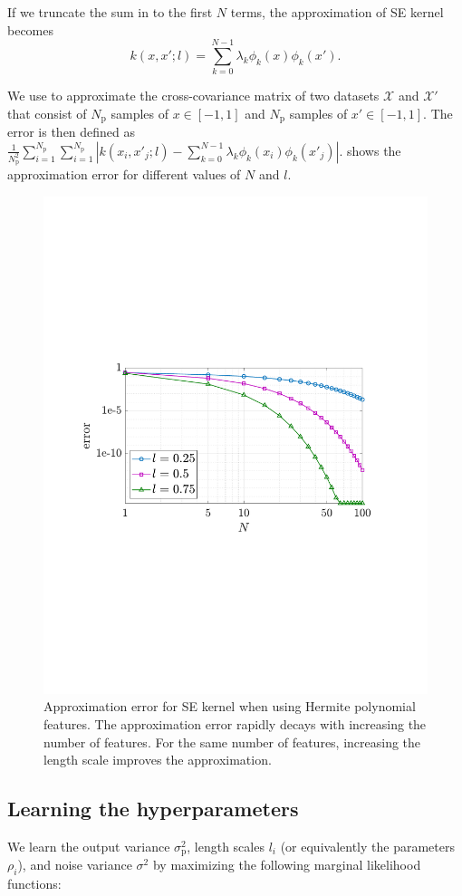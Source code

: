 \documentclass{article}
\begin{document}
If we truncate the sum in  to the first $N$ terms, the approximation of SE kernel becomes
\begin{equation}\label{eqn622}
	k(x, x'; l) = \sum_{k=0}^{N-1} \lambda_k \phi_k(x) \phi_k(x').
\end{equation}

We use  to approximate the cross-covariance matrix of two datasets $\mathcal{X}$ and $\mathcal{X}'$ that consist of $N_\text{p}$ samples of $x \in [-1,1]$ and $N_\text{p}$ samples of $x' \in [-1,1]$.
The error is then defined as $\frac{1}{N_\text{p}^2} \sum_{i=1}^{N_\text{p}} \sum_{i=1}^{N_\text{p}}| k(x_i,x'_j;l) -  \sum_{k=0}^{N-1} \lambda_k \phi_k(x_i) \phi_k(x'_j)|$.
 shows the approximation error for different values of $N$ and $l$.

\begin{figure}[t]
	\centering
	\includegraphics[width=0.6\linewidth]{img/approxError.pdf}
	\caption{Approximation error for SE kernel when using Hermite polynomial features. The approximation error rapidly decays with increasing the number of features. For the same number of features, increasing the length scale improves the approximation.}
	\label{fig:approxError}
\end{figure}

\subsection{Learning the hyperparameters}
\label{sec:hyperparameters}
We learn the output variance $\sigma^2_\text{p}$, length scales $l_i$ (or equivalently the parameters $\rho_i$), and noise variance $\sigma^2$ by maximizing the following marginal likelihood functions:
\end{document}
